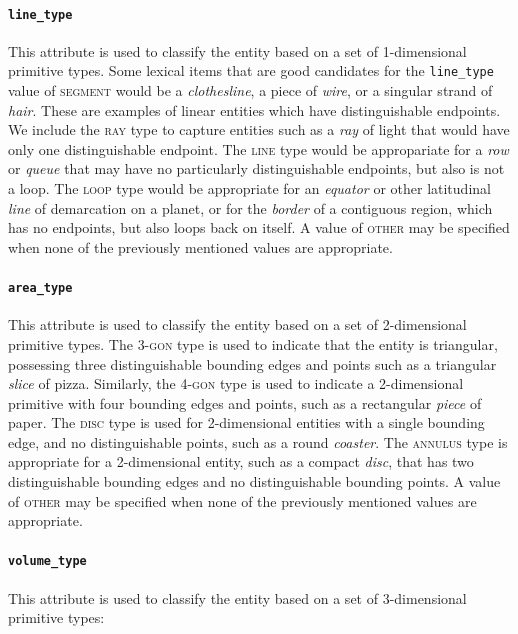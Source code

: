 \documentclass[11pt]{article}
\begin{document}
\paragraph{\texttt{line\_type}} %
\label{par:line_type}
This attribute is used to classify the entity based on a set of 1-dimensional primitive types. Some lexical items that are good candidates for the \texttt{line\_type} value of \textsc{segment} would be a \emph{clothesline}, a piece of \emph{wire}, or a singular strand of \emph{hair}. These are examples of linear entities which have distinguishable endpoints. We include the \textsc{ray} type to capture entities such as a \emph{ray} of light that would have only one distinguishable endpoint. The \textsc{line} type would be appropariate for a \emph{row} or \emph{queue} that may have no particularly distinguishable endpoints, but also is not a loop. The \textsc{loop} type would be appropriate for an \emph{equator} or other latitudinal \emph{line} of demarcation on a planet, or for the \emph{border} of a contiguous region, which has no endpoints, but also loops back on itself. A value of \textsc{other} may be specified when none of the previously mentioned values are appropriate.

\paragraph{\texttt{area\_type}} %
\label{par:area_type}
This attribute is used to classify the entity based on a set of 2-dimensional primitive types. The \textsc{3-gon} type is used to indicate that the entity is triangular, possessing three distinguishable bounding edges and points such as a triangular \emph{slice} of pizza. Similarly, the \textsc{4-gon} type is used to indicate a 2-dimensional primitive with four bounding edges and points, such as a rectangular \emph{piece} of paper. The \textsc{disc} type is used for 2-dimensional entities with a single bounding edge, and no distinguishable points, such as a round \emph{coaster}. The \textsc{annulus} type is appropriate for a 2-dimensional entity, such as a compact \emph{disc}, that has two distinguishable bounding edges and no distinguishable bounding points. A value of \textsc{other} may be specified when none of the previously mentioned values are appropriate.

\paragraph{\texttt{volume\_type}} %
\label{par:volume_type}
This attribute is used to classify the entity based on a set of 3-dimensional primitive types:
\end{document}
